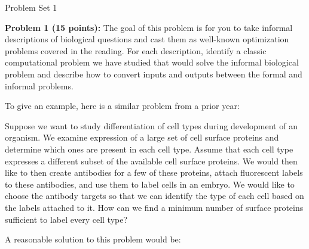 \documentclass[11pt]{article}
\begin{document}

\begin{center}
{\huge Problem Set 1 }\\
\end{center}

{\bf Problem 1 (15 points):} The goal of this problem is for you to
take informal descriptions of biological questions and cast them as
well-known optimization problems covered in the reading.  For each
description, identify a classic computational problem we have studied
that would solve the informal biological problem and describe how to
convert inputs and outputs between the formal and informal problems.

To give an example, here is a similar problem from a prior year:

\hspace*{0.5in}
\begin{minipage}{5.5in}
Suppose we want to study differentiation of cell types during
development of an organism.  We examine expression of a large set of cell surface proteins and determine which ones are present in each cell type.  Assume that each cell type expresses a different subset of the available cell surface proteins.  We would then like to then create antibodies for a few of these proteins, attach fluorescent labels to these antibodies, and use them to label cells in an embryo. We would like to choose the antibody targets so that we can identify the type of each cell based on the labels attached to it.  How can we find a minimum number of surface proteins sufficient to label every cell type?
\end{minipage}

A reasonable solution to this problem would be:
\end{document}
